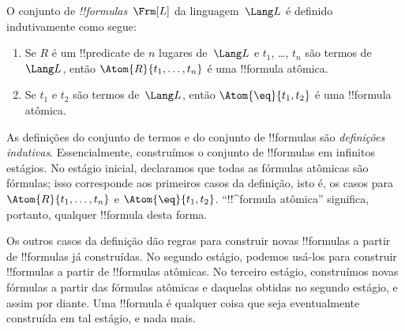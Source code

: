 \documentclass[../../../include/open-logic-section]{subfiles}
\begin{document}
\begin{defn}[Fórmulas]
O conjunto de \emph{!!{formula}s}~$\Frm[L]$ da linguagem~$\Lang L$
é definido indutivamente como segue:
\begin{enumerate}


\item Se $R$ é um !!{predicate} de $n$ lugares de~$\Lang L$ e $t_1$, \dots,
  $t_n$ são termos de~$\Lang L$, então $\Atom{R}{t_1,\ldots, t_n}$ é uma
  !!{formula} atômica.

\item Se $t_1$ e $t_2$ são termos de~$\Lang L$, então $\Atom{\eq}{t_1, t_2}$
  é uma !!{formula} atômica.








\end{enumerate}
\end{defn}

\begin{explain}
As definições do conjunto de termos e do conjunto de !!{formula}s são
\emph{definições indutivas}.  Essencialmente, construímos o conjunto de
!!{formula}s em infinitos estágios.  No estágio inicial,
declaramos que todas as fórmulas atômicas são fórmulas; isso corresponde aos
primeiros casos da definição, isto é, os casos para
%
%
$\Atom{R}{t_1,\dots,t_n}$ e $\Atom{\eq}{t_1,t_2}$. ``!!^{formula}
atômica'' significa, portanto, qualquer !!{formula} desta forma.

Os outros casos da definição dão regras para construir novas
!!{formula}s a partir de !!{formula}s já construídas.  No segundo
estágio, podemos usá-los para construir !!{formula}s a partir de
!!{formula}s atômicas.  No terceiro estágio, construímos novas fórmulas a partir das
fórmulas atômicas e daquelas obtidas no segundo estágio, e assim por diante.  Uma
!!{formula} é qualquer coisa que seja eventualmente construída em tal
estágio, e nada mais.
\end{explain}
\end{document}
